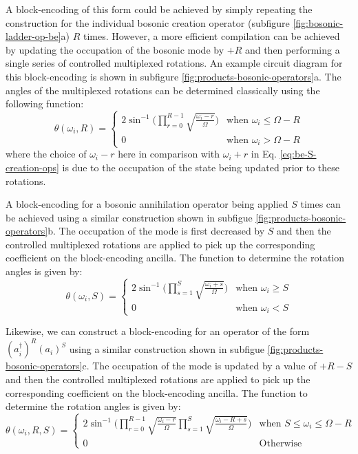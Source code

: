 A block-encoding of this form could be achieved by simply repeating the construction for the individual bosonic creation operator (subfigure \ref{fig:bosonic-ladder-op-be}a) $R$ times.
However, a more efficient compilation can be achieved by updating the occupation of the bosonic mode by $+R$ and then performing a single series of controlled multiplexed rotations.
An example circuit diagram for this block-encoding is shown in subfigure \ref{fig:products-bosonic-operators}a.
The angles of the multiplexed rotations can be determined classically using the following function:
\begin{equation}
    \theta(\omega_i, R) = 
    \begin{cases} 
        2\sin^{-1}\Big(\prod_{r=0}^{R-1}\sqrt{\frac{\omega_i - r}{\Omega}}\Big) & \text{when } \omega_i \leq \Omega - R \\
        0 & \text{when } \omega_i > \Omega - R
    \end{cases}
\end{equation}
where the choice of $\omega_i - r$ here in comparison with $\omega_i + r$ in Eq. \ref{eq:be-S-creation-ops} is due to the occupation of the state being updated prior to these rotations.

A block-encoding for a bosonic annihilation operator being applied $S$ times can be achieved using a similar construction shown in subfigue \ref{fig:products-bosonic-operators}b.
The occupation of the mode is first decreased by $S$ and then the controlled multiplexed rotations are applied to pick up the corresponding coefficient on the block-encoding ancilla.
The function to determine the rotation angles is given by:
\begin{equation}
    \theta(\omega_i, S) = 
    \begin{cases} 
        2\sin^{-1}\Big(\prod_{s=1}^{S}\sqrt{\frac{\omega_i + s}{\Omega}}\Big) & \text{when } \omega_i \geq S \\
        0 & \text{when } \omega_i < S
    \end{cases}
\end{equation}

Likewise, we can construct a block-encoding for an operator of the form $(a_i^\dagger)^R (a_i)^S$ using a similar construction shown in subfigue \ref{fig:products-bosonic-operators}c.
The occupation of the mode is updated by a value of $+ R - S$ and then the controlled multiplexed rotations are applied to pick up the corresponding coefficient on the block-encoding ancilla.
The function to determine the rotation angles is given by:
\begin{equation}
    \theta(\omega_i, R, S) = 
    \begin{cases} 
        2\sin^{-1}\Big(\prod_{r=0}^{R-1}\sqrt{\frac{\omega_i - r}{\Omega}} \prod_{s=1}^{S}\sqrt{\frac{\omega_i - R + s}{\Omega}}\Big) & \text{when } S \leq \omega_i \leq \Omega - R \\
        0 & \text{Otherwise} 
    \end{cases}
\end{equation}

